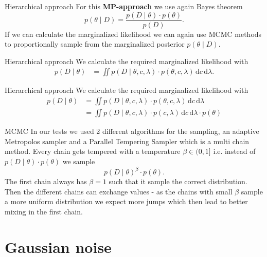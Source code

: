 \documentclass{beamer}
\newcommand{\dx}{\, \mathrm{d}}
\begin{document}
	\begin{frame}{Hierarchical approach}
		For this \textbf{MP-approach} we use again Bayes theorem
		\[
			p(\theta \mid D) = \frac{p(D \mid \theta) \cdot
			p(\theta)}{p(D)}.
		\]
		If we can calculate the marginalized likelihood we can again use MCMC 
		methods to proportionally sample from the marginalized posterior 
		$p(\theta \mid D)$.
	\end{frame}
	
	\begin{frame}{Hierarchical approach}
		We calculate the required marginalized likelihood with
		\begin{align*}
			p(D \mid \theta) &= \iint p(D \mid \theta, c, \lambda) \cdot 
			p(\theta, c, \lambda) \dx c \dx \lambda.
		\end{align*}
	\end{frame}
	
	\begin{frame}[noframenumbering]{Hierarchical approach}
		We calculate the required marginalized likelihood with
		\begin{align*}
			p(D \mid \theta) &= \iint p(D \mid \theta, c, \lambda) \cdot 
			p(\theta, c, \lambda) \dx c \dx \lambda \\
			&= \iint p(D \mid \theta, c, \lambda) \cdot 
			p(c, \lambda) \dx c \dx \lambda \cdot p(\theta)
		\end{align*}
	\end{frame}
	

	
	\begin{frame}{MCMC}
		In our tests we used 2 different algorithms for the sampling, an adaptive 
		Metropolos sampler and a Parallel Tempering Sampler which is a multi chain 
		method. Every chain gets tempered with a temperature $\beta \in (0, 1]$ 
		i.e. instead of $p(D \mid \theta) \cdot p(\theta)$ we sample
		\[
			p(D \mid \theta)^\beta \cdot p(\theta).
		\]
		The first chain always has $\beta = 1$ such that it sample the correct 
		distribution. Then the different chains can exchange values - as the 
		chains with small $\beta$ sample a more uniform distribution we expect 
		more jumps which then lead to better mixing in the first chain.
	\end{frame}
	
	
	
\section{Gaussian noise}
  	
\end{document}
